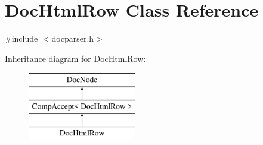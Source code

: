 \hypertarget{class_doc_html_row}{}\section{Doc\+Html\+Row Class Reference}
\label{class_doc_html_row}


{\ttfamily \#include $<$docparser.\+h$>$}

Inheritance diagram for Doc\+Html\+Row\+:\begin{figure}[H]
\begin{center}
\leavevmode
\includegraphics[height=3.000000cm]{class_doc_html_row}
\end{center}
\end{figure}
